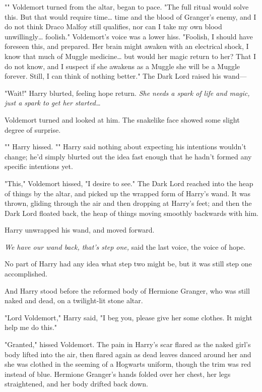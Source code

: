 "" Voldemort turned from the altar,
began to pace. "The full ritual would solve this. But that would require
time{\ldots} time and the blood of Granger's enemy, and I do not think Draco
Malfoy still qualifies, nor can I take my own blood unwillingly{\ldots}
foolish." Voldemort's voice was a lower hiss. "Foolish, I should have foreseen
this, and prepared. Her brain might awaken with an electrical shock, I know
that much of Muggle medicine{\ldots} but would her magic return to her? That I
do not know, and I suspect if she awakens as a Muggle she will be a Muggle
forever. Still, I can think of nothing better." The Dark Lord raised his wand---

"Wait!" Harry blurted, feeling hope return. \emph{She needs a spark of life and
magic, just a spark to get her started{\ldots}}

Voldemort turned and looked at him. The snakelike face showed some slight
degree of surprise.

"" Harry hissed. "" Harry said nothing about
expecting his intentions wouldn't change; he'd simply blurted out the idea fast
enough that he hadn't formed any specific intentions yet.

"This," Voldemort hissed, "I desire to see." The Dark Lord reached into the
heap of things by the altar, and picked up the wrapped form of Harry's wand. It
was thrown, gliding through the air and then dropping at Harry's feet; and then
the Dark Lord floated back, the heap of things moving smoothly backwards with
him.

Harry unwrapped his wand, and moved forward.

\emph{We have our wand back, that's step one,} said the last voice, the voice
of hope.

No part of Harry had any idea what step two might be, but it was still step one
accomplished.

And Harry stood before the reformed body of Hermione Granger, who was still
naked and dead, on a twilight-lit stone altar.

"Lord Voldemort," Harry said, "I beg you, please give her some clothes. It
might help me do this."

"Granted," hissed Voldemort. The pain in Harry's scar flared as the naked
girl's body lifted into the air, then flared again as dead leaves danced around
her and she was clothed in the seeming of a Hogwarts uniform, though the trim
was red instead of blue. Hermione Granger's hands folded over her chest, her
legs straightened, and her body drifted back down.

